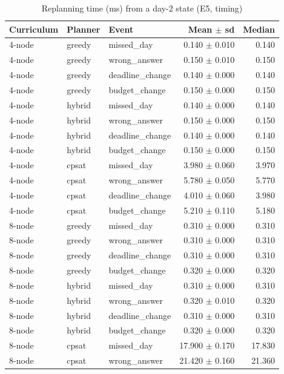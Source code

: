 \begin{table}[htbp]
\centering\small
\caption{Replanning time (ms) from a day-2 state (E5, timing)}
\label{tab:t13b}
\begin{tabular}{lllrr}
\toprule
Curriculum & Planner & Event & Mean $\pm$ sd & Median \\
\midrule
4-node & greedy & missed\_day & 0.140 $\pm$ 0.010 & 0.140 \\
4-node & greedy & wrong\_answer & 0.150 $\pm$ 0.010 & 0.150 \\
4-node & greedy & deadline\_change & 0.140 $\pm$ 0.000 & 0.140 \\
4-node & greedy & budget\_change & 0.150 $\pm$ 0.000 & 0.150 \\
4-node & hybrid & missed\_day & 0.140 $\pm$ 0.000 & 0.140 \\
4-node & hybrid & wrong\_answer & 0.150 $\pm$ 0.000 & 0.150 \\
4-node & hybrid & deadline\_change & 0.140 $\pm$ 0.000 & 0.140 \\
4-node & hybrid & budget\_change & 0.150 $\pm$ 0.000 & 0.150 \\
4-node & cpsat & missed\_day & 3.980 $\pm$ 0.060 & 3.970 \\
4-node & cpsat & wrong\_answer & 5.780 $\pm$ 0.050 & 5.770 \\
4-node & cpsat & deadline\_change & 4.010 $\pm$ 0.060 & 3.980 \\
4-node & cpsat & budget\_change & 5.210 $\pm$ 0.110 & 5.180 \\
8-node & greedy & missed\_day & 0.310 $\pm$ 0.000 & 0.310 \\
8-node & greedy & wrong\_answer & 0.310 $\pm$ 0.000 & 0.310 \\
8-node & greedy & deadline\_change & 0.310 $\pm$ 0.000 & 0.310 \\
8-node & greedy & budget\_change & 0.320 $\pm$ 0.000 & 0.320 \\
8-node & hybrid & missed\_day & 0.310 $\pm$ 0.000 & 0.310 \\
8-node & hybrid & wrong\_answer & 0.320 $\pm$ 0.010 & 0.320 \\
8-node & hybrid & deadline\_change & 0.310 $\pm$ 0.000 & 0.310 \\
8-node & hybrid & budget\_change & 0.320 $\pm$ 0.000 & 0.320 \\
8-node & cpsat & missed\_day & 17.900 $\pm$ 0.170 & 17.830 \\
8-node & cpsat & wrong\_answer & 21.420 $\pm$ 0.160 & 21.360 \\

\end{tabular}
\end{table}
